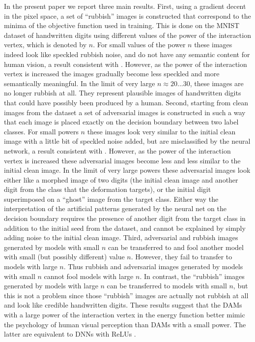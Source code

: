 In the present paper we report three main results. First, using a gradient decent in the pixel space, a set of ``rubbish'' images is constructed that correspond to the minima of the objective function used in training. This is done on the MNIST dataset of handwritten digits using different values of the power of the interaction vertex, which is denoted by $n$. For small values of the power $n$ these images indeed look like speckled rubbish noise, and do not have any semantic content for human vision, a result consistent with \cite{Nguyen}. However, as the power of the interaction vertex is increased the images gradually become less speckled and more semantically meaningful. In the limit of very large $n\approx20...30$, these images are no longer rubbish at all. They represent plausible images of handwritten digits that could have possibly been produced by a human. Second, starting from clean images from the dataset a set of adversarial images is constructed in such a way that each image is placed exactly on the decision boundary between two label classes. For small powers $n$ these images look very similar to the initial clean image with a little bit of speckled noise added, but are misclassified by the neural network, a result consistent with \cite{Szegedy}. However, as the power of the interaction vertex is increased these adversarial images become less and less similar to the initial clean image. In the limit of very large powers these adversarial images look either like a morphed image of two digits (the initial clean image and another digit from the class that the deformation targets), or the initial digit superimposed on a ``ghost'' image from the target class. Either way the interpretation of the artificial patterns generated by the neural net on the decision boundary requires the presence of another digit from the target class in addition to the initial seed from the dataset, and cannot be explained by simply adding noise to the initial clean image. Third, adversarial and rubbish images generated by models with small $n$ can be transferred to and fool another model with small (but possibly different) value $n$. However, they fail to transfer to models with large $n$. Thus rubbish and adversarial images generated by models with small $n$ cannot fool models with large $n$. In contrast, the ``rubbish'' images generated by models with large $n$ can be transferred to models with small $n$, but this is not a problem since those ``rubbish'' images are actually not rubbish at all and look like credible handwritten digits. These results suggest that the DAMs with a large power of the interaction vertex in the energy function better mimic the psychology of human visual perception than DAMs with a small power. The latter are equivalent to DNNs with ReLUs \cite{Krotov Hopfield}.

